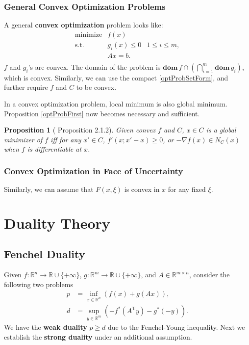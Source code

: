 \documentclass[openany]{book}
\newtheorem{proposition}{Proposition}[chapter]
\theoremstyle{definition}
\theoremstyle{remark}
\begin{document}
\subsection{General Convex Optimization Problems}
A general \textbf{convex optimization} problem looks like:
\begin{equation}\label{convOptProb}
\begin{array}{lll}
\mathrm{minimize} & f(x) & \\
\mathrm{s.t.} & g_i(x)\le0 & 1\le i\le m, \\
 & Ax=b. & \\
\end{array}
\end{equation}
$f$ and $g_i$'s are convex. The domain of the problem is $\mathbf{dom}\,f\cap\left(\bigcap_{i=1}^m\mathbf{dom}\,g_i\right)$, which is convex. Similarly, we can use the compact \eqref{optProbSetForm}, and further require $f$ and $C$ to be convex.

In a convex optimization problem, local minimum is also global minimum. Proposition \ref{optProbFirst} now becomes necessary and sufficient.
\begin{proposition}[\cite{BL10} Proposition 2.1.2]\label{convOptProbFirst}
    Given convex $f$ and $C$, $x\in C$ is a global minimizer of $f$ iff for any $x'\in C$, $f'(x;x'-x)\ge0$, or $-\nabla f(x)\in N_C(x)$ when $f$ is differentiable at $x$.
\end{proposition}

\subsection{Convex Optimization in Face of Uncertainty}
Similarly, we can assume that $F(x,\xi)$ is convex in $x$ for any fixed $\xi$.

\chapter{Duality Theory}
\section{Fenchel Duality}
Given $f:\mathbb{R}^n\to \mathbb{R}\cup\{+\infty\}$, $g:\mathbb{R}^m\to \mathbb{R}\cup\{+\infty\}$, and $A\in \mathbb{R}^{m\times n}$, consider the following two problems
\begin{align}
    p & =\inf_{x\in \mathbb{R}^n}\left(f(x)+g(Ax)\right), \label{FenchelPrimal}\\
    d & =\sup_{y\in \mathbb{R}^m}\left(-f^*(A^{\mathrm{T}}y)-g^*(-y)\right). \label{FenchelDual}
\end{align}
We have the \textbf{weak duality} $p\ge d$ due to the Fenchel-Young inequality. Next we establish the \textbf{strong duality} under an additional assumption.
\end{document}
